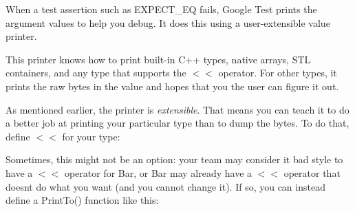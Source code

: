 When a test assertion such as {\ttfamily E\+X\+P\+E\+C\+T\+\_\+\+EQ} fails, Google Test prints the argument values to help you debug. It does this using a user-\/extensible value printer.

This printer knows how to print built-\/in C++ types, native arrays, S\+TL containers, and any type that supports the {\ttfamily $<$$<$} operator. For other types, it prints the raw bytes in the value and hopes that you the user can figure it out.

As mentioned earlier, the printer is {\itshape extensible}. That means you can teach it to do a better job at printing your particular type than to dump the bytes. To do that, define {\ttfamily $<$$<$} for your type\+:


\begin{DoxyCode}{0}
\DoxyCodeLine{}
\DoxyCodeLine{}
\DoxyCodeLine{}
\DoxyCodeLine{\}}
\DoxyCodeLine{}
\end{DoxyCode}


Sometimes, this might not be an option\+: your team may consider it bad style to have a {\ttfamily $<$$<$} operator for {\ttfamily Bar}, or {\ttfamily Bar} may already have a {\ttfamily $<$$<$} operator that doesn\textquotesingle{}t do what you want (and you cannot change it). If so, you can instead define a {\ttfamily Print\+To()} function like this\+:


\begin{DoxyCode}{0}
\DoxyCodeLine{}
\DoxyCodeLine{}
\DoxyCodeLine{}
\DoxyCodeLine{\}}
\DoxyCodeLine{}
\end{DoxyCode}


